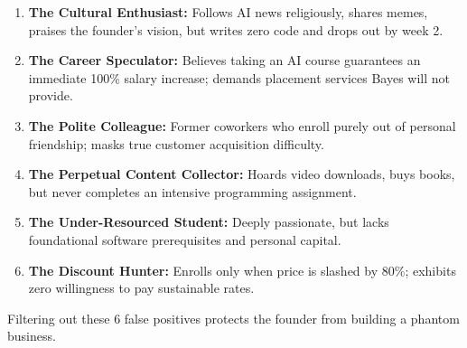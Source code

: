 \begin{enumerate}[leftmargin=1.2em,itemsep=0.2ex]
  \item \textbf{The Cultural Enthusiast:} Follows AI news religiously, shares memes, praises the founder's vision, but writes zero code and drops out by week 2.
  \item \textbf{The Career Speculator:} Believes taking an AI course guarantees an immediate 100\% salary increase; demands placement services Bayes will not provide.
  \item \textbf{The Polite Colleague:} Former coworkers who enroll purely out of personal friendship; masks true customer acquisition difficulty.
  \item \textbf{The Perpetual Content Collector:} Hoards video downloads, buys books, but never completes an intensive programming assignment.
  \item \textbf{The Under-Resourced Student:} Deeply passionate, but lacks foundational software prerequisites and personal capital.
  \item \textbf{The Discount Hunter:} Enrolls only when price is slashed by 80\%; exhibits zero willingness to pay sustainable rates.
\end{enumerate}
Filtering out these 6 false positives protects the founder from building a phantom business.
